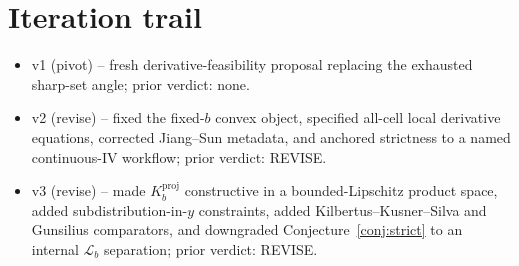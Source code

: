 \documentclass[11pt]{article}
\theoremstyle{definition}
\theoremstyle{plain}
\theoremstyle{remark}
\begin{document}
\section{Iteration trail}
\begin{itemize}[leftmargin=*]
\item v1 (pivot) -- fresh derivative-feasibility proposal replacing the exhausted sharp-set angle; prior verdict: none.
\item v2 (revise) -- fixed the fixed-\(b\) convex object, specified all-cell local derivative equations, corrected Jiang--Sun metadata, and anchored strictness to a named continuous-IV workflow; prior verdict: REVISE.
\item v3 (revise) -- made \(K_b^{\mathrm{proj}}\) constructive in a bounded-Lipschitz product space, added subdistribution-in-\(y\) constraints, added Kilbertus--Kusner--Silva and Gunsilius comparators, and downgraded Conjecture~\ref{conj:strict} to an internal \(\mathcal L_b\) separation; prior verdict: REVISE.
\end{itemize}
\end{document}
